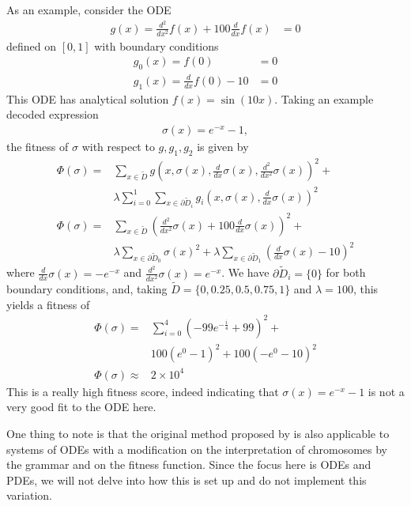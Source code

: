 \documentclass[aps,reprint,superscriptaddress,nofootinbib]{revtex4-2}
\begin{document}
As an example, consider the ODE
\begin{align*}
    g(x) = \frac{d^2}{dx^2}f(x) + 100\frac{d}{dx}f(x) &= 0
\end{align*}
defined on \([0, 1]\) with boundary conditions
\begin{align*}
    g_0(x) = f(0) &= 0
    \\
    g_1(x) = \frac{d}{dx}f(0) - 10 &= 0
\end{align*}
This ODE has analytical solution \(f(x) = \sin(10x)\). Taking an example decoded expression
\begin{align*}
    \sigma(x) = e^{-x}-1,
\end{align*}
the fitness of \(\sigma\) with respect to \(g, g_1, g_2\) is given by
\begin{align*}
    \Phi(\sigma) =& \sum_{x\in\widetilde{D}}g\left(x, \sigma(x), \frac{d}{dx}\sigma(x), \frac{d^2}{dx^2}\sigma(x)\right)^2 + 
    \\
    &\lambda\sum_{i=0}^1\sum_{x\in\partial\widetilde{D}_i}g_i\left(x, \sigma(x), \frac{d}{dx}\sigma(x)\right)^2
    \\
    \Phi(\sigma) =& \sum_{x\in\widetilde{D}}\left(\frac{d^2}{dx^2}\sigma(x) + 100\frac{d}{dx}\sigma(x)\right)^2 +
    \\
    &\lambda\sum_{x\in\partial\widetilde{D}_0}\sigma(x)^2 + \lambda\sum_{x\in\partial\widetilde{D}_1}\left(\frac{d}{dx}\sigma(x)-10\right)^2
\end{align*}
where \(\frac{d}{dx}\sigma(x) = -e^{-x}\) and \(\frac{d^2}{dx^2}\sigma(x) = e^{-x}\). We have \(\partial\widetilde{D}_i = \{0\}\) for both boundary conditions, and, taking \(\widetilde{D} = \{0, 0.25, 0.5, 0.75, 1\}\) and \(\lambda = 100\), this yields a fitness of
\begin{align*}
    \Phi(\sigma) =& \sum_{i=0}^4 \left(- 99e^{-\frac{i}{4}} + 99\right)^2 +
    \\
    &100 \left(e^0-1\right)^2 + 100\left(-e^0-10\right)^2
    \\
    \Phi(\sigma) \approx& 2 \times 10^4
\end{align*}
This is a really high fitness score, indeed indicating that \(\sigma(x) = e^{-x}-1\) is not a very good fit to the ODE here.

One thing to note is that the original method proposed by \cite{solving_diff_reproduce} is also applicable to systems of ODEs with a modification on the interpretation of chromosomes by the grammar and on the fitness function. Since the focus here is ODEs and PDEs, we will not delve into how this is set up and do not implement this variation.
\end{document}
